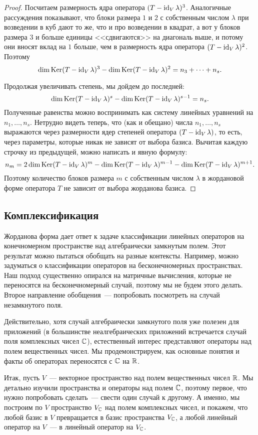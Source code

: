 \begin{proof}
Посчитаем размерность ядра оператора $(T-\operatorname{id}_V\lambda)^3$.
Аналогичные рассуждения показывают, что блоки размера $1$ и $2$
с собственным числом $\lambda$ при возведении в куб дают то же, что и
про возведении в квадрат, а вот у блоков размера $3$ и больше
единицы <<сдвигаются>> на диагональ выше, и потому они вносят
вклад на $1$ больше, чем в размерность ядра оператора
$(T-\operatorname{id}_V\lambda)^2$. Поэтому
$$
\dim\operatorname{Ker}(T-\operatorname{id}_V\lambda)^3 - \dim\operatorname{Ker}(T-\operatorname{id}_V\lambda)^2 = n_3 + \dots + n_s.
$$

Продолжая увеличивать степень, мы дойдем до последней:
$$
\dim\operatorname{Ker}(T-\operatorname{id}_V\lambda)^s - \dim\operatorname{Ker}(T-\operatorname{id}_V\lambda)^{s-1} = n_s.
$$
Полученные равенства можно воспринимать как систему линейных уравнений
на $n_1,\dots,n_s$. Нетрудно видеть теперь, что (как и обещано)
числа $n_1,\dots,n_s$ выражаются через размерности ядер степеней
оператора $(T-\operatorname{id}_V\lambda)$, то есть, через параметры, которые никак
не зависят от выбора базиса. Вычитая каждую строчку из
предыдущей, можно написать и явную формулу:
$$
n_m = 2\dim\operatorname{Ker}(T-\operatorname{id}_V\lambda)^m - \dim\operatorname{Ker}(T-\operatorname{id}_V\lambda)^{m-1}
-\dim\operatorname{Ker}(T-\operatorname{id}_V\lambda)^{m+1}.
$$
Поэтому количество блоков размера $m$ с собственным числом $\lambda$
в жордановой форме оператора $T$ не зависит от выбора жорданова базиса.
\end{proof}

\subsection{Комплексификация}

Жорданова форма дает ответ к задаче классификации линейных операторов
на конечномерном пространстве над алгебраически замкнутым полем.
Этот результат можно пытаться обобщать на разные контексты. Например,
можно задуматься о классификации операторов на бесконечномерных
пространствах. Наш подход существенно опирался на матричные вычисления,
которые не переносятся на бесконечномерный случай, поэтому мы
не будем этого делать. Второе направление обобщения~--- попробовать
посмотреть на случай незамкнутого поля.

Действительно, хотя случай алгебраически замкнутого поля уже
полезен для приложений (в большинстве неалгебраических приложений
встречается случай поля комплексных чисел $\mathbb C$), естественный интерес
представляют операторы над полем вещественных чисел.
Мы продемонстрируем, как основные понятия и факты об операторах
переносятся с $\mathbb C$ на $\mathbb R$.

Итак, пусть $V$~--- векторное пространство над полем вещественных
чисел $\mathbb R$. Мы детально изучили  пространства и операторы
над полем $\mathbb C$, поэтому первое, что нужно попробовать сделать~---
свести один случай к другому. А именно, мы построим по $V$
пространство $V_{\mathbb C}$ над полем комплексных чисел, и покажем,
что любой базис в $V$ превращается в базис пространства $V_{\mathbb C}$,
а любой линейный оператор на $V$~--- в линейный оператор на $V_{\mathbb C}$.

